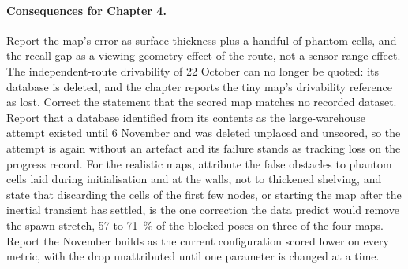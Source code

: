 \documentclass[11pt,a4paper,notitlepage]{report}
\begin{document}
\paragraph{Consequences for Chapter 4.} Report the map's error as surface
thickness plus a handful of phantom cells, and the recall gap as a
viewing-geometry effect of the route, not a sensor-range effect. The
independent-route drivability of 22 October can no longer be quoted: its
database is deleted, and the chapter reports the tiny map's drivability
reference as lost. Correct the statement that the scored map matches no
recorded dataset. Report that a database identified from its contents as the
large-warehouse attempt existed until 6 November and was deleted unplaced and
unscored, so the attempt is again without an artefact and its failure stands
as tracking loss on the progress record. For the realistic maps, attribute the false obstacles to phantom cells
laid during initialisation and at the walls, not to thickened shelving, and
state that discarding the cells of the first few nodes, or starting the map
after the inertial transient has settled, is the one correction the data
predict would remove the spawn stretch, 57 to \SI{71}{\percent} of the blocked
poses on three of the four maps. Report the November builds as the current
configuration scored lower on every metric, with the drop unattributed until
one parameter is changed at a time.
\end{document}
